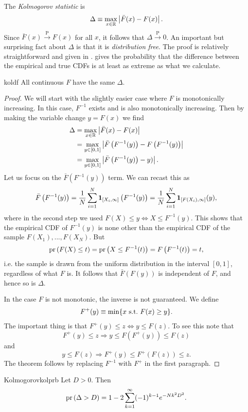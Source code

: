 The {\it Kolmogorov statistic} is
\begin{equation}
  \Delta\equiv\max_{x\in\mathbb{R}}\left|\bar{F}(x)-F(x)\right|.
\end{equation}
Since $\bar{F}(x)\xrightarrow{\text{P}}F(x)$ for all $x$, it follows
that $\Delta\xrightarrow{\text{P}}0$. An important but surprising
fact about $\Delta$ is that it is {\it distribution free}.
The proof is relatively straightforward and given in
.  gives
the probability that the difference between the empirical and true
CDFs is at least as extreme as what we calculate.
\begin{theorem}{}{koldf}
  All continuous $F$ have the same $\Delta$. 
  \begin{proof}
    We will start with the slightly easier case where $F$ is monotonically
    increasing. In this case, $F^{-1}$ exists and is also monotonically
    increasing. Then by making the variable change $y=F(x)$ we find
    \begin{equation*}
      \begin{aligned}
      \Delta&=\max_{x\in\mathbb{R}}\left|\bar{F}(x)-F(x)\right|\\
            &=\max_{y\in[0,1]}\left|
                \bar{F}\left(F^{-1}(y)\right)-F\left(F^{-1}(y)\right)\right|\\
            &=\max_{y\in[0,1]}\left|
                \bar{F}\left(F^{-1}(y)\right)-y)\right|.
      \end{aligned}
    \end{equation*}
    Let us focus on the $\bar{F}(F^{-1}(y))$ term. We can recast this as
    $$
      \bar{F}\left(F^{-1}(y)\right)
          =\frac{1}{N}\sum_{i=1}^N{\mathbf 1}_{[X_i,\infty]}\left(F^{-1}(y)\right)
          =\frac{1}{N}\sum_{i=1}^N{\mathbf 1}_{[F(X_i),\infty]}(y),
    $$
    where in the second step we used 
    $F(X)\leq y\Leftrightarrow X\leq F^{-1}(y)$. This shows that the
    empirical CDF of $F^{-1}(y)$ is none other than the empirical CDF 
    of the sample $F(X_1),...,F(X_N)$. But
    $$
      \pr{F(X)\leq t}=\pr{X\leq F^{-1}(t)}=F\left(F^{-1}(t)\right)=t,
    $$
    i.e. the sample is drawn from the uniform distribution in the
    interval $[0,1]$, regardless of what $F$ is. It follows that 
    $\bar{F}\left(F(y)\right)$ is independent of $F$, and hence so 
    is $\Delta$.

    In the case $F$ is not monotonic, the inverse is not guaranteed.
    We define
    $$
      F^+(y)\equiv\min\{x~\text{s.t.}~ F(x)\geq y\}.
    $$
    The important thing is that $F^+(y)\leq z\Leftrightarrow y\leq F(z)$.
    To see this note that
    $$
      F^+(y)\leq z \Rightarrow y\leq F\left(F^+(y)\right)\leq F(z)
    $$
    and
    $$
      y\leq F(z)\Rightarrow F^+(y)\leq F^+\left(F(z)\right)\leq z.
    $$
    The theorem follows by replacing $F^{-1}$ with $F^+$ 
    in the first paragraph.
  \end{proof}
\end{theorem}
\begin{theorem}{Kolmogorov}{kolprb}
  Let $D>0$. Then
  $$
    \pr{\Delta>D}=1-2\sum_{k=1}^\infty(-1)^{k-1}e^{-Nk^2D^2}.
  $$
\end{theorem}

